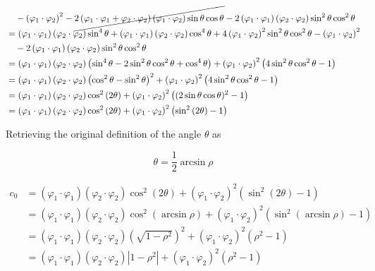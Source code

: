 \documentclass{article}[a4]
\begin{document}
\begin{align*}
    & \quad - \left( \varphi_1\cdot\varphi_2 \right)^2 - \cancel{2 \left( \varphi_1\cdot\varphi_1 + \varphi_2\cdot\varphi_2 \right) \left( \varphi_1\cdot\varphi_2 \right) \sin \theta \cos \theta} - 2 \left( \varphi_1\cdot\varphi_1 \right) \left( \varphi_2\cdot\varphi_2 \right) \sin^2 \theta \cos^2 \theta \\
    &= \left( \varphi_1\cdot\varphi_1 \right) \left( \varphi_2\cdot\varphi_2 \right) \sin^4 \theta + \left( \varphi_1\cdot\varphi_1 \right) \left( \varphi_2\cdot\varphi_2 \right) \cos^4 \theta + 4 \left( \varphi_1\cdot\varphi_2 \right)^2 \sin^2 \theta \cos^2 \theta - \left( \varphi_1\cdot\varphi_2 \right)^2 \\
    & \quad - 2 \left( \varphi_1\cdot\varphi_1 \right) \left( \varphi_2\cdot\varphi_2 \right) \sin^2 \theta \cos^2 \theta \\
    &= \left( \varphi_1\cdot\varphi_1 \right) \left( \varphi_2\cdot\varphi_2 \right) \left( \sin^4 \theta - 2 \sin^2 \theta \cos^2 \theta + \cos^4 \theta \right) + \left( \varphi_1\cdot\varphi_2 \right)^2 \left( 4 \sin^2 \theta \cos^2 \theta - 1 \right) \\
    &= \left( \varphi_1\cdot\varphi_1 \right) \left( \varphi_2\cdot\varphi_2 \right) \left( \cos^2 \theta - \sin^2 \theta \right)^2 + \left( \varphi_1\cdot\varphi_2 \right)^2 \left( 4 \sin^2 \theta \cos^2 \theta - 1 \right) \\
    &= \left( \varphi_1\cdot\varphi_1 \right) \left( \varphi_2\cdot\varphi_2 \right) \cos^2 \left( 2\theta \right) + \left( \varphi_1\cdot\varphi_2 \right)^2 \left( (2 \sin \theta \cos \theta)^2 - 1 \right) \\
    &= \left( \varphi_1\cdot\varphi_1 \right) \left( \varphi_2\cdot\varphi_2 \right) \cos^2 \left( 2\theta \right) + \left( \varphi_1\cdot\varphi_2 \right)^2 \left( \sin^2 \left( 2\theta \right) - 1 \right) \\
\end{align*}

Retrieving the original definition of the angle \(\theta\) as

\[\theta = \frac{1}{2} \arcsin \rho\]

\begin{align*}
c_0 &= \left( \varphi_1\cdot\varphi_1 \right) \left( \varphi_2\cdot\varphi_2 \right) \cos^2 \left( 2\theta \right) + \left( \varphi_1\cdot\varphi_2 \right)^2 \left( \sin^2 \left( 2\theta \right) - 1 \right) \\
    &= \left( \varphi_1\cdot\varphi_1 \right) \left( \varphi_2\cdot\varphi_2 \right) \cos^2 \left( \arcsin \rho \right) + \left( \varphi_1\cdot\varphi_2 \right)^2 \left( \sin^2 \left( \arcsin \rho \right) - 1 \right) \\
    &= \left( \varphi_1\cdot\varphi_1 \right) \left( \varphi_2\cdot\varphi_2 \right) \left( \sqrt{1 - \rho^2} \right)^2 + \left( \varphi_1\cdot\varphi_2 \right)^2 \left( \rho^2 - 1 \right) \\
    &= \left( \varphi_1\cdot\varphi_1 \right) \left( \varphi_2\cdot\varphi_2 \right) \left| 1 - \rho^2 \right| + \left( \varphi_1\cdot\varphi_2 \right)^2 \left( \rho^2 - 1 \right) \\
\end{align*}
\end{document}
